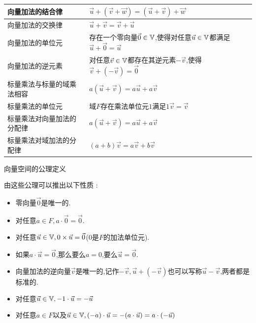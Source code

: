 {{{          \begin{center}
              \begin{tabular}{|l|l|}
                  \hline
                  向量加法的结合律           & $\vec{u} + (\vec{v} + \vec{w}) = (\vec{u} + \vec{v}) + \vec{w}$                                            \\
                  \hline
                  向量加法的交换律           & $\vec{u} + \vec{v} = \vec{v} + \vec{u}$                                                                    \\
                  \hline
                  向量加法的单位元           & 存在一个零向量$\vec{0} \in \mathbb{V}$,使得对任意$\vec{u} \in \mathbb{V}$都满足$\vec{u} + \vec{0} = \vec{u}$ \\
                  \hline
                  向量加法的逆元素           & 对任意$\vec{v} \in \mathbb{V}$都存在其逆元素$-\vec{v}$,使得$\vec{v} + (-\vec{v}) = \vec{0}$                 \\
                  \hline
                  标量乘法与标量的域乘法相容 & $a(\vec{u} + \vec{v}) = a\vec{u} + a\vec{v}$                                                               \\
                  \hline
                  标量乘法的单位元           & 域$F$存在乘法单位元$1$满足$1\vec{v} = \vec{v}$                                                             \\
                  \hline
                  标量乘法对向量加法的分配律 & $a(\vec{u} + \vec{v}) = a\vec{u} + a\vec{v}$                                                               \\
                  \hline
                  标量乘法对域加法的分配律   & $(a + b)\vec{v} = a\vec{v} + b\vec{v}$                                                                     \\
                  \hline
              \end{tabular}

              向量空间的公理定义
          \end{center}

          由这些公理可以推出以下性质 :

          \begin{itemize}
              \item 零向量$\vec{0}$是唯一的.
              \item 对任意$a \in F,a \cdot \vec{0} = \vec{0}$.
              \item 对任意$\vec{u} \in \mathbb{V},0 \times \vec{u} = \vec{0}$($0$是$F$的加法单位元).
              \item 如果$a \cdot \vec{u} = \vec{0}$,那么要么$a = 0$,要么$\vec{u} = \vec{0}$.
              \item 向量加法的逆向量$\vec{v}$是唯一的,记作$-\vec{v},\vec{u} + (-\vec{v})$也可以写称$\vec{u} - \vec{v}$,两者都是标准的.
              \item 对任意$\vec{u} \in \mathbb{V},-1 \cdot \vec{u} = -\vec{u}$
              \item 对任意$a \in F$以及$\vec{u} \in \mathbb{V},(-a) \cdot \vec{u} = -(a \cdot \vec{u}) = a \cdot (-\vec{u})$
          \end{itemize}
      }%

  }%

 }%